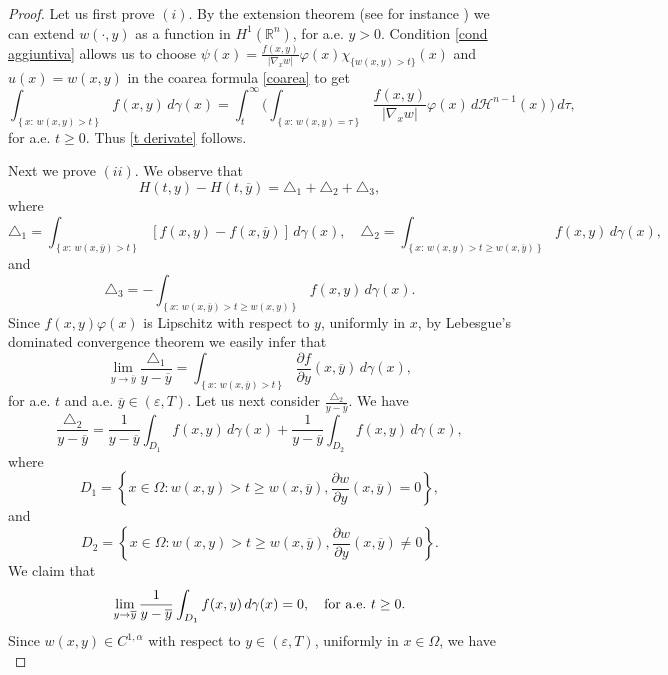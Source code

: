 \documentclass[a4paper,10pt,reqno]{amsart}
\newcommand{\R}{\mathbb{R}}
\numberwithin{equation}{section}
\begin{document}
\begin{proof}
Let us first prove $(i)$. By the extension theorem (see for instance \cite{FEOPOST})
we can extend $w(\cdot,y)$ as a function in $H^1(\R^n)$, for a.e. $y>0$.
Condition \eqref{cond aggiuntiva} allows us to choose
$\psi(x)=\frac{f(x,y)}{|\nabla_xw|}\varphi(x)\chi_{\{w(x,y)>t\}}(x)$ and $u(x)=w(x,y)$
in the coarea formula \eqref{coarea} to get
$$\int_{\left\{x:\,w(x,y)>t\right\}}f(x,y)\,d\gamma(x)=\int_{t}^{\infty}\bigg(\int_{\left\{x:\,w(x,y)=\tau\right\}}
\frac{f(x,y)}{|\nabla_{x}w|}\varphi(x)\,d\mathcal{H}^{n-1}(x)\bigg)\,d\tau,$$
for a.e. $t\geq0$. Thus \eqref{t derivate} follows.

Next we prove $(ii)$.
We observe that
\[
H(t,y)-H(t,\overline{y})=\triangle_{1}+\triangle_{2}+\triangle_{3},
\]
where
$$\triangle_{1}=\int_{\left\{x:\,w(x,\overline{y})>t\right\}}
[f(x,y)-f(x,\overline{y})]\,d\gamma(x),\quad
\triangle_{2}=\int_{\left\{x:\,w(x,y)>t\geq w(x,\overline{y})\right\}}f(x,y)\,d\gamma(x),$$
and
$$\triangle_{3}=-\int_{\left\{x:\,w(x,\overline{y})>t\geq w(x,y)\right\}}f(x,y)\,d\gamma(x).$$
Since $f(x,y)\varphi(x)$ is Lipschitz with respect
to $y$, uniformly in $x$, by Lebesgue's dominated convergence theorem we easily infer that
\begin{equation}
\underset{y\rightarrow\overline{y}}{\lim}\frac{\triangle_1}{y-\overline{y}}=\int_{\left\{x:\,w(x,\overline{y})>t\right\}}
\frac{\partial f}{\partial y}(x,\overline{y})\,d\gamma(x),
\label{DELTA 1}%
\end{equation}
for a.e. $t$ and a.e. $\overline{y}\in(\varepsilon,T)$.
Let us next consider $\frac{\triangle_{2}}{y-\overline{y}}.$ We have%
\begin{equation}
\frac{\triangle_{2}}{y-\overline{y}}=\frac{1}{y-\overline{y}}\displaystyle\int_{D_{1}}f(x,y)\,d\gamma(x)
+\frac{1}{y-\overline{y}}\int_{D_{2}}f(x,y)\,d\gamma(x),
\label{divisa}%
\end{equation}
where
\[
D_{1}=\left\{x\in\Omega:w(x,y)>t\geq w(x,\overline{y}),\frac{\partial w
}{\partial y}(x,\overline{y})=0\right\},
\]
and
\[
D_{2}=\left\{x\in\Omega:w(x,y)>t\geq w(x,\overline{y}),\frac{\partial w
}{\partial y}(x,\overline{y})\neq0\right\}.
\]
We claim that
\begin{equation}
\lim_{y\rightarrow\overline{y}}\frac{1}{y-\overline{y}}\int_{D_{1}}f(x,y)\,d\gamma(x)=0,\quad
\hbox{for a.e.}~t\geq0.
\label{zero}%
\end{equation}
Since $w(x,y)\in C^{1,\alpha}$ with respect to $y\in(\varepsilon,T)$, uniformly in $x\in\Omega$, we have
\begin{equation}

\end{equation}
\end{proof}
\end{document}
